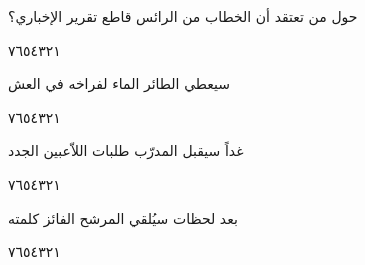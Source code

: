 \documentclass[11pt, a4paper]{article}
\begin{document}
{\vspace{0.5\baselineskip}\begin{flushright}
\textarabic{حول من تعتقد أن الخطاب من الرائس قاطع تقرير الإخباري؟}
\end{flushright}

\begin{center}
        \hfill\textarabic{٧}\hfill\textarabic{٦}\hfill\textarabic{٥}\hfill\textarabic{٤}\hfill\textarabic{٣}\hfill\textarabic{٢}\hfill\textarabic{١}
        \end{center}


\vspace{0.5\baselineskip}\begin{flushright}
\textarabic{سيعطي الطائر الماء لفراخه في العش}
\end{flushright}

\begin{center}
        \hfill\textarabic{٧}\hfill\textarabic{٦}\hfill\textarabic{٥}\hfill\textarabic{٤}\hfill\textarabic{٣}\hfill\textarabic{٢}\hfill\textarabic{١}
        \end{center}


\vspace{0.5\baselineskip}\begin{flushright}
\textarabic{غداً سيقبل المدرّب طلبات اللاّعبين الجدد}
\end{flushright}

\begin{center}
        \hfill\textarabic{٧}\hfill\textarabic{٦}\hfill\textarabic{٥}\hfill\textarabic{٤}\hfill\textarabic{٣}\hfill\textarabic{٢}\hfill\textarabic{١}
        \end{center}


\vspace{0.5\baselineskip}\begin{flushright}
\textarabic{بعد لحظات سيُلقي المرشح الفائز كلمته}
\end{flushright}

\begin{center}
        \hfill\textarabic{٧}\hfill\textarabic{٦}\hfill\textarabic{٥}\hfill\textarabic{٤}\hfill\textarabic{٣}\hfill\textarabic{٢}\hfill\textarabic{١}
        \end{center}


\vspace{0.5\baselineskip}}



\vfill
\end{document}
